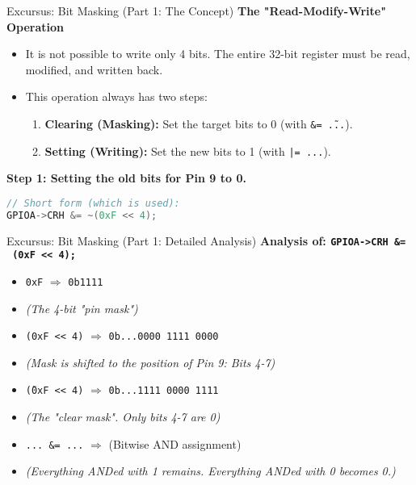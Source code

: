 \documentclass{beamer}
\begin{document}
\begin{frame}[fragile]{Excursus: Bit Masking (Part 1: The Concept)}
\textbf{The "Read-Modify-Write" Operation}
\begin{itemize}
\item It is not possible to write only 4 bits. The entire 32-bit register must be read, modified, and written back.
\item This operation always has two steps:
\begin{enumerate}
	\item \textbf{Clearing (Masking):} Set the target bits to 0 (with \texttt{\&= \~...}).
	\item \textbf{Setting (Writing):} Set the new bits to 1 (with \texttt{|= ...}).
\end{enumerate}
\end{itemize}

\bigskip
\textbf{Step 1: Setting the old bits for Pin 9 to 0.}
\begin{lstlisting}[language=C, style=mystyle]
// Short form (which is used):
GPIOA->CRH &= ~(0xF << 4);
\end{lstlisting}
\end{frame}

\begin{frame}[fragile]{Excursus: Bit Masking (Part 1: Detailed Analysis)}
\textbf{Analysis of: \texttt{GPIOA->CRH \&= ~(0xF << 4);}}

\begin{itemize}
\item \texttt{0xF} $\Rightarrow$ \texttt{0b1111}
\item \textit{(The 4-bit "pin mask")}

\medskip
\item \texttt{(0xF << 4)} $\Rightarrow$ \texttt{0b...0000 1111 0000}
\item \textit{(Mask is shifted to the position of Pin 9: Bits 4-7)}

\medskip
\item \texttt{\~ (0xF << 4)} $\Rightarrow$ \texttt{0b...1111 0000 1111}
\item \textit{(The "clear mask". Only bits 4-7 are 0)}

\medskip
\item \texttt{... \&= ...} $\Rightarrow$ (Bitwise AND assignment)
\item \textit{(Everything ANDed with 1 remains. Everything ANDed with 0 becomes 0.)}
\end{itemize}
\end{frame}
\end{document}
